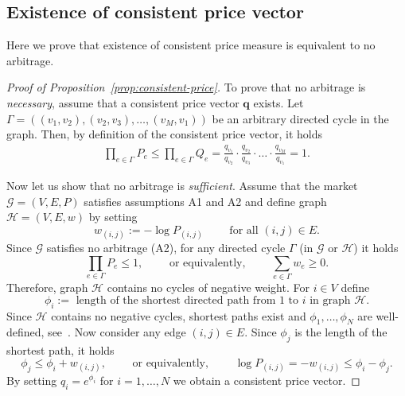 \documentclass{article}
\theoremstyle{definition}
\def\bq{\mathbf{q}}
\begin{document}
\subsection{Existence of consistent price vector} \label{append:consistent-price}
Here we prove that existence of consistent price measure is equivalent to no arbitrage.
\begin{proof}[Proof of Proposition~\ref{prop:consistent-price}]
To prove that no arbitrage is  \emph{necessary}, assume that a consistent price vector $\bq$ exists. Let $\Gamma = ((v_1, v_2), (v_2, v_3), \dots, (v_M, v_1))$ be an arbitrary directed cycle in the graph. Then, by definition of the  consistent price vector, it holds
\begin{align*}
\prod_{e \in \Gamma} P_e \leq \prod_{e \in \Gamma} Q_e = \frac{q_{v_1}}{q_{v_2}} \cdot \frac{q_{v_2}}{q_{v_3}} \cdot \dots \cdot \frac{q_{v_M}}{q_{v_1}}   = 1.  
\end{align*} 

Now let us show that no arbitrage is \emph{sufficient}. Assume that the market $\mathcal{G} = (V, E, P)$ satisfies assumptions A1 and A2 and  define graph $\mathcal{H} = (V, E, w)$ by setting
\[
w_{(i,j)} := - \log P_{(i,j)} \quad \quad \text{ for all } (i, j) \in E.
\]
Since $\mathcal{G}$ satisfies no arbitrage (A2), for any directed cycle $\Gamma$ (in $\mathcal{G}$ or $\mathcal{H}$) it holds
\[
\prod_{e \in \Gamma} P_e \leq 1, \quad \quad \text{ or equivalently, } \quad \quad \sum_{e \in \Gamma} w_e \geq 0.
\]
Therefore, graph $\mathcal{H}$ contains no cycles of negative weight. For $i \in V$ define 
\[
\phi_i := \text{ length of the shortest directed path from 1 to } i \text{ in graph } \mathcal{H}.
\]
Since $\mathcal{H}$ contains no negative cycles, shortest paths exist and $\phi_1, \dots, \phi_N$ are well-defined, see~\cite[Theorem 24.4]{CormenETAL09}. Now consider any edge $(i,j) \in E$. Since $\phi_j$ is the length of the shortest path, it holds
\[
\phi_j \leq \phi_i + w_{(i,j)}, \quad \quad \text{ or equivalently, } \quad \quad \log P_{(i,j)} = -w_{(i,j)} \leq \phi_i - \phi_j.
\]
By setting $q_i = e^{\phi_i}$ for $i=1, \dots, N$ we obtain a consistent price vector.
\end{proof}
\end{document}
